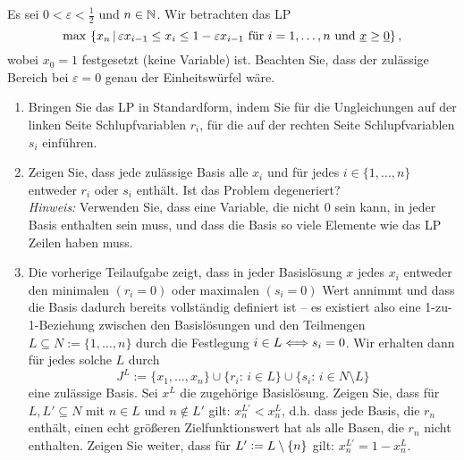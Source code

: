 \documentclass[11pt,german,a4paper,parskip=half-]{scrartcl}
\renewcommand{\u}[1]{\ensuremath{\underline{#1}}} %
\begin{document}
\begin{exercise}{4}
Es sei $0 < \varepsilon < \frac12$ und $n \in \mathbb{N}$. Wir betrachten das LP
\[\max\,\left\{x_n\,|\,\varepsilon x_{i-1} \leq x_i \leq 1-\varepsilon x_{i-1}\text{ für }i=1,\dotsc,n\text{ und } \u x \geq \u 0\right\}\tk\]
wobei $x_0=1$ festgesetzt (keine Variable) ist. Beachten Sie, dass der zulässige Bereich bei $\varepsilon=0$ genau der Einheitswürfel wäre.
\begin{enumerate}
 \item Bringen Sie das LP in Standardform, indem Sie für die Ungleichungen auf der linken Seite Schlupfvariablen $r_i$, für die auf der rechten Seite Schlupfvariablen $s_i$ einführen.
 \item Zeigen Sie, dass jede zulässige Basis alle $x_i$ und für jedes $i\in\{1,\dotsc,n\}$ entweder $r_i$ oder $s_i$ enthält. Ist das Problem degeneriert?\\
{\it Hinweis:} Verwenden Sie, dass eine Variable, die nicht $0$ sein kann, in jeder Basis enthalten sein muss, und dass die Basis so viele Elemente wie das LP Zeilen haben muss.
 \item Die vorherige Teilaufgabe zeigt, dass in jeder Basislösung $x$ jedes $x_i$ entweder den minimalen $(r_i=0)$ oder maximalen $(s_i=0)$ Wert annimmt und dass die Basis dadurch bereits
vollständig definiert ist – es existiert also eine 1-zu-1-Beziehung zwischen den Basislösungen und den Teilmengen $L \subseteq N := \{1,\dotsc,n\}$ durch die Festlegung $i \in L \Longleftrightarrow s_i=0$. Wir
erhalten dann für jedes solche $L$ durch
\[J^L := \{x_1,\dotsc,x_n\} \cup \{r_i:\, i \in L\} \cup \{s_i:\, i \in N \setminus L\}\]
eine zulässige Basis. Sei $x^L$ die zugehörige Basislösung. Zeigen Sie, dass für $L, L' \subseteq N$ mit $n \in L$ und $n \notin L'$ gilt: $x_n^{L'} < x_n^L$, d.h. dass jede Basis, die $r_n$ enthält,
einen echt größeren Zielfunktionswert hat als alle Basen, die $r_n$ nicht enthalten. Zeigen Sie weiter, dass für $L' \vcentcolon= L\setminus\{n\}$ gilt: $x_n^{L'} = 1-x_n^L$.
\end{enumerate}
\end{exercise}
\end{document}
